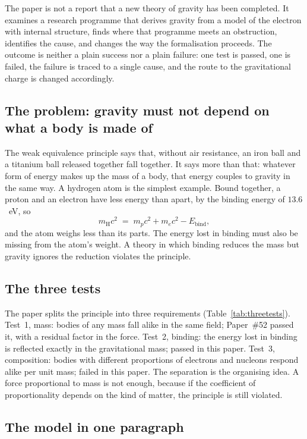 \documentclass[%
 reprint, amsmath,amssymb, aps, prb, ]{revtex4-2}
\numberwithin{equation}{section}
\begin{document}
The paper is not a report that a new theory of gravity has been completed. It examines a research programme that derives gravity from a model of the electron with internal structure, finds where that programme meets an obstruction, identifies the cause, and changes the way the formalisation proceeds. The outcome is neither a plain success nor a plain failure: one test is passed, one is failed, the failure is traced to a single cause, and the route to the gravitational charge is changed accordingly.

\subsection{The problem: gravity must not depend on what a body is made of}

The weak equivalence principle says that, without air resistance, an iron ball and a titanium ball released together fall together. It says more than that: whatever form of energy makes up the mass of a body, that energy couples to gravity in the same way. A hydrogen atom is the simplest example. Bound together, a proton and an electron have less energy than apart, by the binding energy of $13.6$~eV, so
\begin{equation}
m_{\text{H}}c^{2} \;=\; m_pc^{2} + m_ec^{2} - E_{\text{bind}},
\label{eq:app_H}
\end{equation}
and the atom weighs less than its parts. The energy lost in binding must also be missing from the atom's weight. A theory in which binding reduces the mass but gravity ignores the reduction violates the principle.

\subsection{The three tests}

The paper splits the principle into three requirements (Table~\ref{tab:threetests}). Test~1, mass: bodies of any mass fall alike in the same field; Paper~\#52 passed it, with a residual factor in the force. Test~2, binding: the energy lost in binding is reflected exactly in the gravitational mass; passed in this paper. Test~3, composition: bodies with different proportions of electrons and nucleons respond alike per unit mass; failed in this paper. The separation is the organising idea. A force proportional to mass is not enough, because if the coefficient of proportionality depends on the kind of matter, the principle is still violated.

\subsection{The model in one paragraph}
\end{document}
